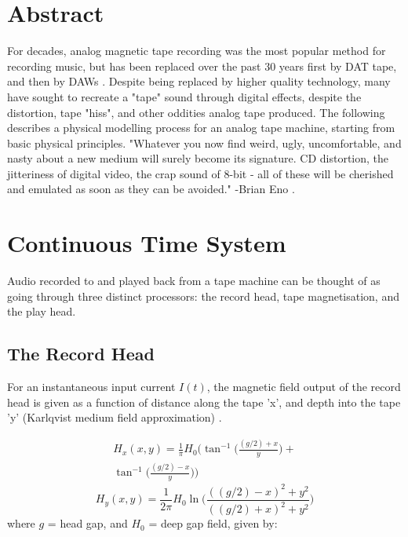 \documentclass[twoside,a4paper]{article}
\title{\papertitle}
\affiliation{
\paperauthorA \,}
{\href{http://ccrma.stanford.edu}{Center for Computer Research in Music and Acoustics} \\ Stanford University \\ Palo Alto, CA \\ {\tt \href{mailto:jatin@ccrma.stanford.edu}{jatin@ccrma.stanford.edu}}}
\newif\ifpdf
\begin{document}
\ifpdf %
  \DeclareGraphicsExtensions{.png,.jpg,.pdf}
\else  %
\fi

\maketitle

\section{Abstract}
For decades, analog magnetic tape recording was the most popular
method for recording music, but has been replaced over the past 30 years first by
DAT tape, and then by DAWs \cite{Kadis}. Despite being replaced
by higher quality technology,
many have sought to recreate a "tape" sound through digital effects, despite
the distortion, tape "hiss", and other oddities analog tape produced.
The following describes
a physical modelling process for an analog tape machine,
starting from basic physical principles.
\newline\newline
"Whatever you now find weird, ugly, uncomfortable, and nasty
about a new medium will surely become its signature. CD distortion, the jitteriness
of digital video, the crap sound of 8-bit - all of these will be cherished
and emulated as soon as they can be avoided." -Brian Eno \cite{Eno}.

\section{Continuous Time System}
Audio recorded to and played back from a tape machine can be thought of as going
through three distinct processors: the record head, tape magnetisation, and the play
head.

\subsection{The Record Head}
For an instantaneous input current $I(t)$, the magnetic field output of the record 
head is given as a function of distance along the tape 'x', and depth into 
the tape 'y' (Karlqvist medium field approximation) \cite{1994tmr..book.....B}.

\begin{multline}
    H_x(x,y) = \frac{1}{\pi} H_0 \Big(\tan^{-1} \Big(\frac{(g/2) + x}{y} \Big) + \\
    \tan^{-1} \Big(\frac{(g/2) - x}{y} \Big) \Big)
    \label{eq1}
\end{multline}
\begin{equation}
    H_y(x,y) = \frac{1}{2 \pi} H_0 \ln \Big(\frac{((g/2) - x)^2 + y^2}{((g/2) + x)^2 + y^2} \Big)
    \label{eq2}
\end{equation}
%
where $g$ = head gap, and $H_0$ = deep gap field, given by:
\end{document}
